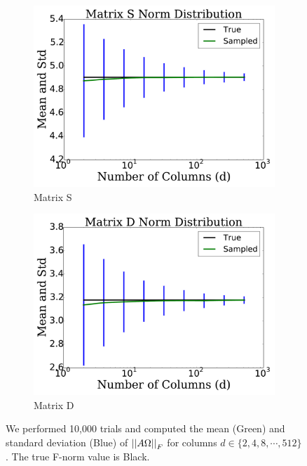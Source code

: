 \begin{figure}[p]
    \begin{subfigure}{0.45\textwidth}
    \includegraphics[width=\textwidth]{plots/mat_S_error_test.pdf}
    \caption{Matrix S}
    \end{subfigure}
    \begin{subfigure}{0.45\textwidth}
    \includegraphics[width=\textwidth]{plots/mat_D_error_test.pdf}
    \caption{Matrix D}
    \end{subfigure}

\caption[GEB Stochastic F-norm Approximations]{
We performed 10,000 trials and computed the mean (Green) and
standard deviation (Blue) of $\left| \left| A\Omega \right| \right|_{F}$ for columns
$d\in\{2,4,8,\cdots,512\}$.
The true F-norm value is Black.
}
\label{fig:geb_norm_bound_mat}
\end{figure}



